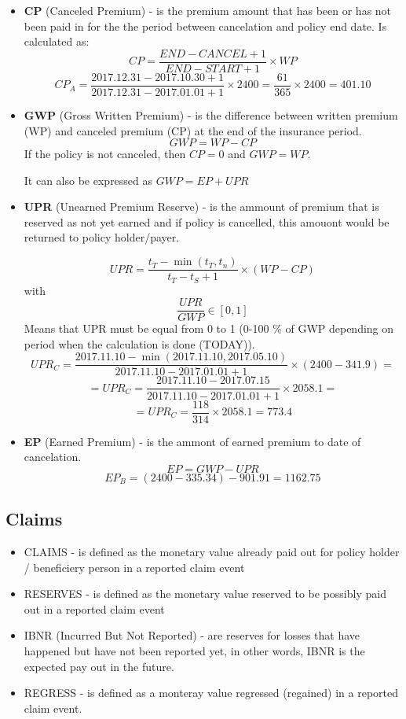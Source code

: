 \documentclass[11pt,a4paper,fleqn]{article}      %
\begin{document}
\begin{itemize}
\item \textbf{CP} (Canceled Premium) - is the premium amount that has been or has not been paid in for the the period between cancelation and policy end date. Is calculated as: 
$$CP=\frac{END-CANCEL+1}{END-START+1} \times WP $$
$$CP_A=\frac{2017.12.31-2017.10.30+1}{2017.12.31-2017.01.01+1} \times 2400=  \frac{61}{365} \times 2400=401.10 $$

\item \textbf{GWP} (Gross Written Premium) - is the difference between written premium (WP) and canceled premium (CP) at the end of the insurance period. $$GWP=WP-CP$$ 
If the policy is not canceled, then $CP=0$ and $GWP=WP$.

It can also be expressed as $GWP=EP+UPR$

\item \textbf{UPR} (Unearned Premium Reserve) - is the ammount of premium that is reserved as not yet earned and if policy is cancelled, this amouont would be returned to policy holder/payer. 

$$UPR=\frac{t_T - \min(t_T,t_n)}{t_T - t_S +1 } \times (WP - CP)$$ 
with $$\frac{UPR}{GWP} \in [0,1]$$ Means that UPR must be equal from 0 to 1 (0-100 \% of GWP depending on period when the calculation is done (TODAY)).
$$UPR_C=\frac{2017.11.10-\min(2017.11.10,2017.05.10)}{2017.11.10-2017.01.01+1} \times (2400-341.9)=$$
$$=UPR_C=\frac{2017.11.10-2017.07.15}{2017.11.10-2017.01.01 +1} \times 2058.1=$$
$$=UPR_C=\frac{118}{314} \times 2058.1=773.4$$

\item \textbf{EP} (Earned Premium) - is the ammont of earned premium to date of cancelation. 
$$EP=GWP-UPR$$
$$EP_B=(2400-335.34)-901.91=1162.75$$


\end{itemize}


\subsection{Claims}

\begin{itemize}
\item CLAIMS - is defined as the monetary value already paid out for policy holder / beneficiery person in a reported claim event
\item RESERVES - is defined as the monetary value reserved to be possibly paid out in a reported claim event
\item IBNR (Incurred But Not Reported) - are reserves for losses that have happened but have not been reported yet, in other words, IBNR is the expected pay out in the future.
\item REGRESS - is defined as a monteray value regressed (regained) in a reported claim event.
\end{itemize}
\end{document}
